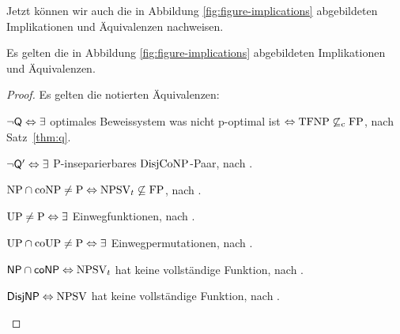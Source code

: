 Jetzt können wir auch die in Abbildung \ref{fig:figure-implications} abgebildeten Implikationen und Äquivalenzen nachweisen.
\begin{theorem}\label{thm:figure-implications}
    Es gelten die in Abbildung \ref{fig:figure-implications} abgebildeten Implikationen und Äquivalenzen.
\end{theorem}
\begin{proof}
    Es gelten die notierten Äquivalenzen:
    \begin{Prooflist}[nosep]
        \item $\neg\mathsf{Q} \Leftrightarrow \exists$ optimales Beweissystem was nicht p-optimal ist $\Leftrightarrow \mathrm{TFNP}\not\subseteq_\mathrm{c} \mathrm{FP}$, nach Satz~\ref{thm:q}.
        \item $\neg\mathsf{Q}' \Leftrightarrow\exists$ P-inseparierbares $\mathrm{DisjCoNP}$-Paar, nach \textcite[Lemma~2.12, vgl. Appendix]{fortnow_separability_1993}.
        \item $\mathrm{NP}\cap\mathrm{coNP}\neq\mathrm{P} \Leftrightarrow \mathrm{NPSV}_t\not\subseteq\mathrm{FP}$, nach \textcite[Prop.~1]{fenner_inverting_2003}.
    \item $\mathrm{UP}\neq\mathrm{P} \Leftrightarrow\exists$ Einwegfunktionen, nach \textcite[Thm.~10]{grollmann_complexity_1988}.
    \item $\mathrm{UP}\cap\mathrm{coUP}\neq\mathrm{P} \Leftrightarrow\exists$ Einwegpermutationen, nach \textcite{homan_one-way_2003}.
    \item $\mathsf{NP}{}\cap{}\mathsf{coNP} \Leftrightarrow \mathrm{NPSV}_t$ hat keine vollständige Funktion, nach \textcite[Prop.~3]{beyersdorff_nondeterministic_2009}.
    \item $\mathsf{DisjNP} \Leftrightarrow \mathrm{NPSV}$ hat keine vollständige Funktion, nach \textcite[Thm.~9]{glaser_reductions_2005}.
    \end{Prooflist}


\end{proof}
